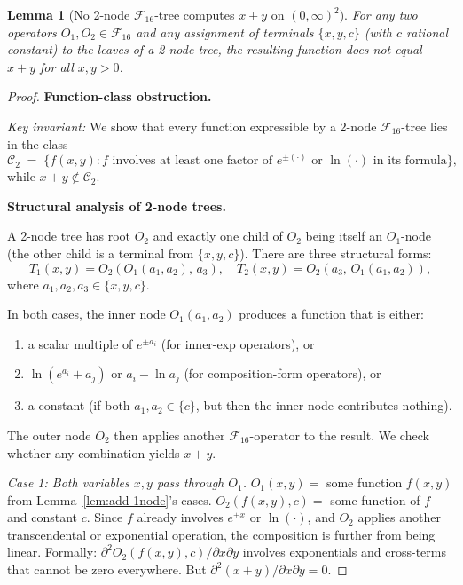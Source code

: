 \documentclass[12pt,a4paper]{article}
\newtheorem{lemma}[theorem]{Lemma}
\theoremstyle{definition}
\newcommand{\F}{\mathcal{F}_{16}}
\begin{document}
\begin{lemma}[No 2-node $\F$-tree computes $x+y$ on $(0,\infty)^2$]
\label{lem:add-2node}
For any two operators $O_1, O_2 \in \F$ and any assignment of terminals
$\{x, y, c\}$ (with $c$ rational constant) to the leaves of a 2-node tree,
the resulting function does not equal $x+y$ for all $x,y>0$.
\end{lemma}

\begin{proof}
\noindent\textbf{Function-class obstruction.}

\noindent\textit{Key invariant:}
We show that every function expressible by a 2-node $\F$-tree lies in the class
\[
  \mathcal{C}_2 \;=\; \{f(x,y) : f \text{ involves at least one factor of } e^{\pm(\cdot)}
  \text{ or } \ln(\cdot)\text{ in its formula}\},
\]
while $x+y \notin \mathcal{C}_2$.

\noindent\textbf{Structural analysis of 2-node trees.}

A 2-node tree has root $O_2$ and exactly one child of $O_2$ being itself an $O_1$-node
(the other child is a terminal from $\{x, y, c\}$).  There are three structural forms:
\[
  T_1(x,y) = O_2(O_1(a_1, a_2),\, a_3),\quad
  T_2(x,y) = O_2(a_3,\, O_1(a_1, a_2)),
\]
where $a_1, a_2, a_3 \in \{x, y, c\}$.

In both cases, the inner node $O_1(a_1,a_2)$ produces a function that is either:
\begin{enumerate}
  \item[(a)] a scalar multiple of $e^{\pm a_i}$ (for inner-exp operators), or
  \item[(b)] $\ln(e^{a_i} + a_j)$ or $a_i - \ln a_j$ (for composition-form operators), or
  \item[(c)] a constant (if both $a_1, a_2 \in \{c\}$, but then the inner node contributes nothing).
\end{enumerate}

The outer node $O_2$ then applies another $\F$-operator to the result.
We check whether any combination yields $x+y$.

\noindent\textit{Case 1: Both variables $x, y$ pass through $O_1$.}
$O_1(x, y) = $ some function $f(x,y)$ from Lemma~\ref{lem:add-1node}'s cases.
$O_2(f(x,y), c) = $ some function of $f$ and constant $c$.
Since $f$ already involves $e^{\pm x}$ or $\ln(\cdot)$, and $O_2$ applies another
transcendental or exponential operation, the composition is further from being linear.
Formally: $\partial^2 O_2(f(x,y),c)/\partial x\partial y$ involves exponentials and
cross-terms that cannot be zero everywhere.  But $\partial^2(x+y)/\partial x\partial y = 0$.


\end{proof}
\end{document}
